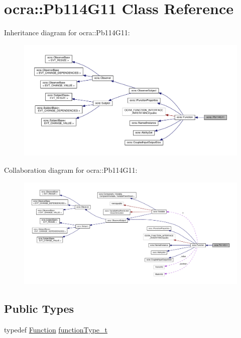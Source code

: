 \hypertarget{classocra_1_1Pb114G11}{}\section{ocra\+:\+:Pb114\+G11 Class Reference}
\label{classocra_1_1Pb114G11}


Inheritance diagram for ocra\+:\+:Pb114\+G11\+:
\nopagebreak
\begin{figure}[H]
\begin{center}
\leavevmode
\includegraphics[width=350pt]{d4/d84/classocra_1_1Pb114G11__inherit__graph}
\end{center}
\end{figure}


Collaboration diagram for ocra\+:\+:Pb114\+G11\+:
\nopagebreak
\begin{figure}[H]
\begin{center}
\leavevmode
\includegraphics[width=350pt]{da/d07/classocra_1_1Pb114G11__coll__graph}
\end{center}
\end{figure}
\subsection*{Public Types}
\begin{DoxyCompactItemize}
\item 
typedef \hyperlink{classocra_1_1Function}{Function} \hyperlink{classocra_1_1Pb114G11_a6a78a86715026be7613e399955407e93}{function\+Type\+\_\+t}
\end{DoxyCompactItemize}
